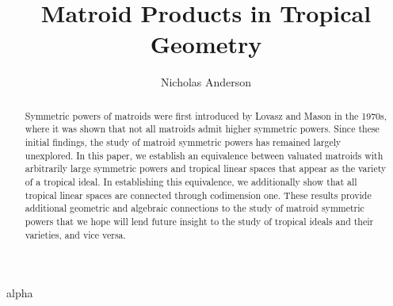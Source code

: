 \documentclass[12pt, a4paper, reqno]{amsart}
\numberwithin{equation}{section}
\begin{document}
\title{Matroid Products in Tropical Geometry}

\author{Nicholas Anderson}
\address{School of Mathematical Sciences, Queen Mary University of
London, Mile End Road, London E1 4NS, United Kingdom}



\begin{abstract}
Symmetric powers of matroids were first introduced by Lovasz \cite{Lovasz77} and Mason \cite{MGlueing} in the 1970s, where it was shown that not all matroids admit higher symmetric powers. Since these initial findings, the study of matroid symmetric powers has remained largely unexplored. In this paper, we establish an equivalence between valuated matroids with arbitrarily large symmetric powers and tropical linear spaces that appear as the variety of a tropical ideal. In establishing this equivalence, we additionally show that all tropical linear spaces are connected through codimension one. These results provide additional geometric and algebraic connections to the study of matroid symmetric powers that we hope will lend future insight to the study of tropical ideals and their varieties, and vice versa.
\end{abstract}





\maketitle






 {alpha}

\end{document}

